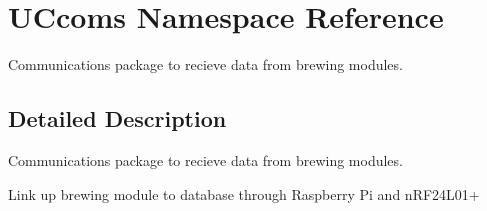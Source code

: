 \hypertarget{namespace_u_ccoms}{}\section{U\+Ccoms Namespace Reference}
\label{namespace_u_ccoms}


Communications package to recieve data from brewing modules.  




\subsection{Detailed Description}
Communications package to recieve data from brewing modules. 

Link up brewing module to database through Raspberry Pi and n\+R\+F24\+L01+ 